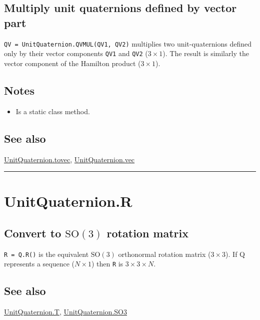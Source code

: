 \subsection*{Multiply unit quaternions defined by vector part}


\texttt{QV = UnitQuaternion.QVMUL(QV1, QV2)} multiplies two unit-quaternions
defined only by their vector components \texttt{QV1} and \texttt{QV2} ($3 \times 1$).  The result is
similarly the vector component of the Hamilton product ($3 \times 1$).


\subsection*{Notes}
\begin{itemize}
  \item Is a static class method.
\end{itemize}

\subsection*{See also}


\hyperlink{UnitQuaternion.tovec}{\color{blue} UnitQuaternion.tovec}, \hyperlink{UnitQuaternion.vec}{\color{blue} UnitQuaternion.vec}

\vspace{1.5ex}\hrule

\hypertarget{UnitQuaternion.R}{\section*{UnitQuaternion.R}}
\subsection*{Convert to $\mbox{SO}(3)$ rotation matrix}


\texttt{R = Q.R()} is the equivalent $\mbox{SO}(3)$ orthonormal rotation matrix ($3 \times 3$).  If
Q represents a sequence ($N \times 1$) then \texttt{R} is $3 \times 3 \times N$.


\subsection*{See also}


\hyperlink{UnitQuaternion.T}{\color{blue} UnitQuaternion.T}, \hyperlink{UnitQuaternion.SO3}{\color{blue} UnitQuaternion.SO3}

